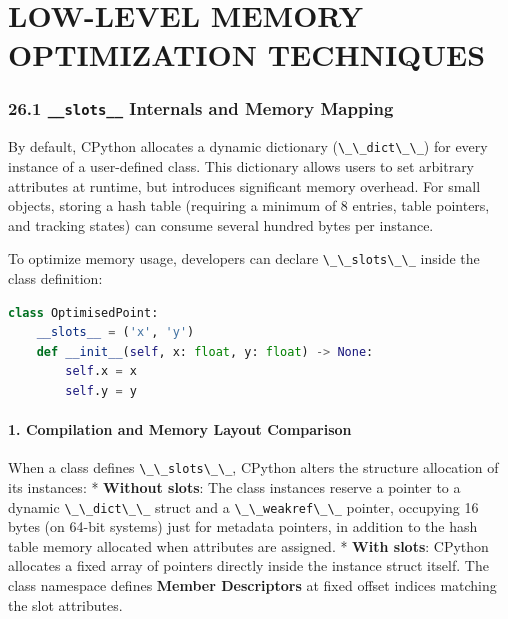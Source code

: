 \hypertarget{low-level-memory-optimization-techniques}{%
\chapter{LOW-LEVEL MEMORY OPTIMIZATION
TECHNIQUES}\label{low-level-memory-optimization-techniques}}

\hypertarget{slots__-internals-and-memory-mapping}{%
\subsection{\texorpdfstring{26.1 \texttt{\_\_slots\_\_} Internals and
Memory
Mapping}{26.1 \_\_slots\_\_ Internals and Memory Mapping}}\label{slots__-internals-and-memory-mapping}}

By default, CPython allocates a dynamic dictionary
(\passthrough{\lstinline!\_\_dict\_\_!}) for every instance of a
user-defined class. This dictionary allows users to set arbitrary
attributes at runtime, but introduces significant memory overhead. For
small objects, storing a hash table (requiring a minimum of 8 entries,
table pointers, and tracking states) can consume several hundred bytes
per instance.

To optimize memory usage, developers can declare
\passthrough{\lstinline!\_\_slots\_\_!} inside the class definition:

\begin{lstlisting}[language=Python]
class OptimisedPoint:
    __slots__ = ('x', 'y')
    def __init__(self, x: float, y: float) -> None:
        self.x = x
        self.y = y
\end{lstlisting}

\hypertarget{compilation-and-memory-layout-comparison}{%
\subsubsection{1. Compilation and Memory Layout
Comparison}\label{compilation-and-memory-layout-comparison}}

When a class defines \passthrough{\lstinline!\_\_slots\_\_!}, CPython
alters the structure allocation of its instances: * \textbf{Without
slots}: The class instances reserve a pointer to a dynamic
\passthrough{\lstinline!\_\_dict\_\_!} struct and a
\passthrough{\lstinline!\_\_weakref\_\_!} pointer, occupying 16 bytes
(on 64-bit systems) just for metadata pointers, in addition to the hash
table memory allocated when attributes are assigned. * \textbf{With
slots}: CPython allocates a fixed array of pointers directly inside the
instance struct itself. The class namespace defines \textbf{Member
Descriptors} at fixed offset indices matching the slot attributes.

